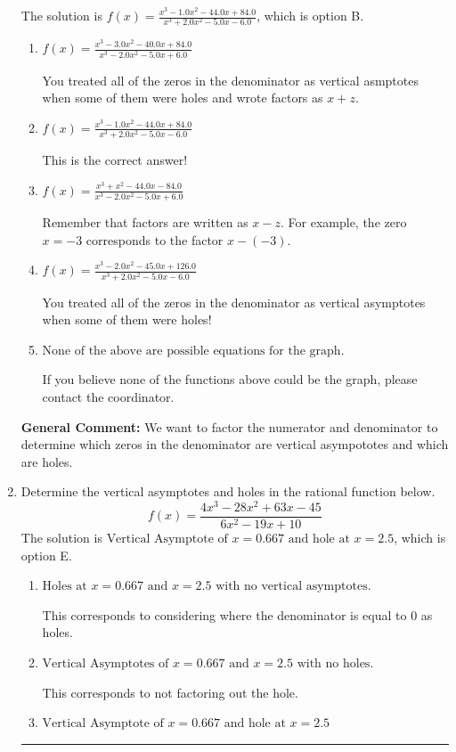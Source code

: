 \documentclass{extbook}[14pt]
\newcommand{\litem}[1]{\item #1

\rule{\textwidth}{0.4pt}}
\begin{document}
\begin{enumerate}
{The solution is \( f(x)=\frac{x^{3} -1.0 x^{2} -44.0 x + 84.0}{x^{3} +2.0 x^{2} -5.0 x -6.0} \), which is option B.\begin{enumerate}[label=\Alph*.]
\item \( f(x)=\frac{x^{3} -3.0 x^{2} -40.0 x + 84.0}{x^{3} -2.0 x^{2} -5.0 x + 6.0} \)

You treated all of the zeros in the denominator as vertical asmptotes when some of them were holes and wrote factors as $x+z$.
\item \( f(x)=\frac{x^{3} -1.0 x^{2} -44.0 x + 84.0}{x^{3} +2.0 x^{2} -5.0 x -6.0} \)

This is the correct answer!
\item \( f(x)=\frac{x^{3} + x^{2} -44.0 x -84.0}{x^{3} -2.0 x^{2} -5.0 x + 6.0} \)

Remember that factors are written as $x-z$. For example, the zero $x=-3$ corresponds to the factor $x-(-3)$.
\item \( f(x)=\frac{x^{3} -2.0 x^{2} -45.0 x + 126.0}{x^{3} +2.0 x^{2} -5.0 x -6.0} \)

You treated all of the zeros in the denominator as vertical asymptotes when some of them were holes!
\item \( \text{None of the above are possible equations for the graph.} \)

If you believe none of the functions above could be the graph, please contact the coordinator.
\end{enumerate}

\textbf{General Comment:} We want to factor the numerator and denominator to determine which zeros in the denominator are vertical asympototes and which are holes.
}
\litem{
Determine the vertical asymptotes and holes in the rational function below.
\[ f(x) = \frac{4x^{3} -28 x^{2} +63 x -45}{6x^{2} -19 x + 10} \]The solution is \( \text{Vertical Asymptote of } x = 0.667 \text{ and hole at } x = 2.5 \), which is option E.\begin{enumerate}[label=\Alph*.]
\item \( \text{Holes at } x = 0.667 \text{ and } x = 2.5 \text{ with no vertical asymptotes.} \)

This corresponds to considering where the denominator is equal to 0 as holes.
\item \( \text{Vertical Asymptotes of } x = 0.667 \text{ and } x = 2.5 \text{ with no holes.} \)

This corresponds to not factoring out the hole.
\item \( \text{Vertical Asymptote of } x = 0.667 \text{ and hole at } x = 2.5 \)


\end{enumerate}}
\end{enumerate}
\end{document}
